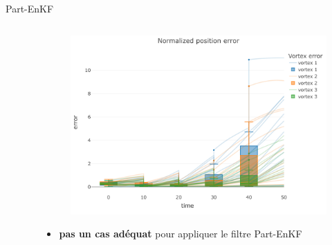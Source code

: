 \documentclass[aspectratio=169]{beamer} %
\begin{document}
\begin{frame}{Part-EnKF}
    \begin{columns}[t]
        \begin{column}{0.5\textwidth}
            \vspace{-0.5cm}
            \begin{figure}
                \centering
            \end{figure}
        \end{column}
        \begin{column}{0.5\textwidth}
            \begin{figure}
                \centering
                \includegraphics[width=\textwidth]{../../conference/images/part_enkf_error.pdf}
            \end{figure}

            \begin{itemize}
                \item \textbf{pas un cas adéquat} pour appliquer le filtre Part-EnKF
            \end{itemize}
        \end{column}
    \end{columns}
\end{frame}
\end{document}
